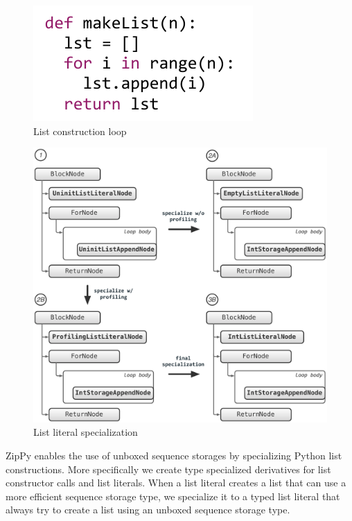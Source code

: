 \begin{figure}[ht]
\centering
\includegraphics[scale=.9]{figures/ch3-list-construction-loop-code.pdf}
\caption{List construction loop}
\label{fig:list-construction-loop-code}
\end{figure}

\begin{figure}[t]
\centering
\includegraphics[scale=.55]{figures/ch3-empty-list-storage-profiling.pdf}
\caption{List literal specialization}
\label{fig:empty-list-storage-profiling}
\end{figure}

ZipPy enables the use of unboxed sequence storages by specializing Python list constructions.
More specifically we create type specialized derivatives for list constructor calls and list literals.
When a list literal creates a list that can use a more efficient sequence storage type, we specialize it to a typed list literal
that always try to create a list using an unboxed sequence storage type.

